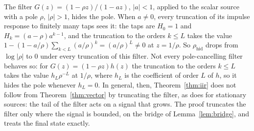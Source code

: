 \documentclass[11pt,onecolumn]{IEEEtran}
\newcommand{\rhid}{\rho_{\mathrm{hid}}}
\begin{document}
The filter $G(z)=(1-\rho z)/(1-az)$, $|a|<1$, applied to the scalar source
with a pole $\rho$, $|\rho|>1$, hides the pole. When $a\ne0$, every truncation of
its impulse response to finitely many taps sees it: the taps are $H_0=1$
and $H_k=(a-\rho)a^{k-1}$, and the truncation to the orders $k\le L$
takes the value $1-(1-a/\rho)\sum_{k<L}(a/\rho)^k=(a/\rho)^L\ne0$ at
$z=1/\rho$. So $\rhid$ drops from $\log|\rho|$ to $0$ under every
truncation of this filter. Not every pole-cancelling filter behaves so:
for $G(z)=(1-\rho z)h(z)$ the truncation to the orders $k\le L$ takes the
value $h_L\rho^{-L}$ at $1/\rho$, where $h_L$ is the coefficient of order
$L$ of $h$, so it hides the pole whenever $h_L=0$. In general, then,
Theorem~\ref{thm:iir} does not follow from Theorem~\ref{thm:vector} by
truncating the filter, as \cite[Theorem~22]{part2} does for stationary
sources: the tail of the filter acts on a signal that grows. The proof
truncates the filter only where the signal is bounded, on the bridge of
Lemma~\ref{lem:bridge}, and treats the final state exactly.
\end{document}
